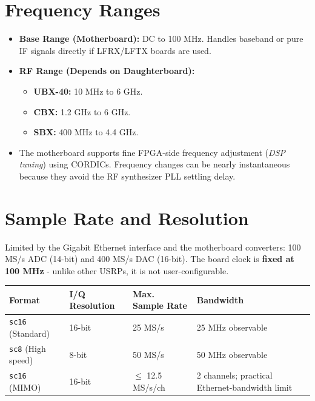 \documentclass[11pt]{article}
\begin{document}
\section{Frequency Ranges}

\begin{itemize}
    \item \textbf{Base Range (Motherboard):} DC to 100 MHz. Handles baseband or pure IF signals directly if LFRX/LFTX boards are used.
    \item \textbf{RF Range (Depends on Daughterboard):}
    \begin{itemize}
        \item \textbf{UBX-40:} 10 MHz to 6 GHz.
        \item \textbf{CBX:} 1.2 GHz to 6 GHz.
        \item \textbf{SBX:} 400 MHz to 4.4 GHz.
    \end{itemize}
    \item The motherboard supports fine FPGA-side frequency adjustment (\textit{DSP tuning}) using CORDICs. Frequency changes can be nearly instantaneous because they avoid the RF synthesizer PLL settling delay.
\end{itemize}

\section{Sample Rate and Resolution}

Limited by the Gigabit Ethernet interface and the motherboard converters: 100 MS/s ADC (14-bit) and 400 MS/s DAC (16-bit). The board clock is \textbf{fixed at 100 MHz} - unlike other USRPs, it is not user-configurable.

\begin{table}[h]
    \centering
    \small
    \begin{tabular}{@{}p{}p{}p{}p{}@{}}
        \toprule
        \textbf{Format} & \textbf{I/Q Resolution} & \textbf{Max. Sample Rate} & \textbf{Bandwidth} \\
        \midrule
        \texttt{sc16} (Standard) & 16-bit & 25 MS/s & 25 MHz observable \\
        \texttt{sc8} (High speed) & 8-bit & 50 MS/s & 50 MHz observable \\
        \texttt{sc16} (MIMO) & 16-bit & $\leq$ 12.5 MS/s/ch & 2 channels; practical Ethernet-bandwidth limit \\
        \bottomrule
    \end{tabular}
\end{table}
\end{document}
